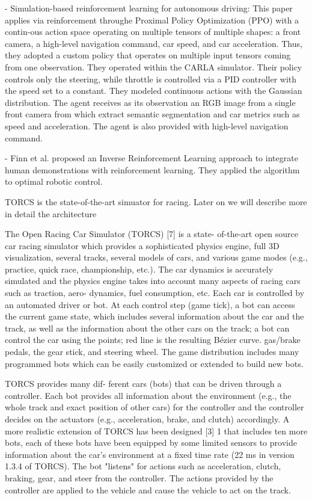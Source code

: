 - Simulation-based reinforcement learning for autonomous driving:
This paper applies via reinforcement throughe Proximal Policy Optimization (PPO) with a contin-ous action space operating on multiple tensors of multiple shapes: a front camera, a high-level navigation command, car speed, and car acceleration. Thus, they adopted a custom policy that operates on multiple input tensors coming from one observation. They operated within the CARLA simulator. Their policy controls only the steering, while throttle is controlled via a PID controller with the speed set to a constant.
They modeled continuous actions with the Gaussian distribution.
The agent receives as its observation an RGB image from a single front camera from which extract semantic segmentation and car metrics such as speed and acceleration. The agent is also provided with high-level navigation command. 



- Finn et al. proposed an Inverse Reinforcement Learning \cite{inverse} approach to integrate human demonstrations with reinforcement learning. They applied the algorithm to optimal robotic control.




TORCS is the state-of-the-art simuator for racing. Later on we will describe more in detail the architecture



The Open Racing Car Simulator (TORCS) [7] is a state-
of-the-art open source car racing simulator which provides
a sophisticated physics engine, full 3D visualization, several
tracks, several models of cars, and various game modes (e.g.,
practice, quick race, championship, etc.). The car dynamics
is accurately simulated and the physics engine takes into
account many aspects of racing cars such as traction, aero-
dynamics, fuel consumption, etc.
Each car is controlled by an automated driver or bot. At
each control step (game tick), a bot can access the current
game state, which includes several information about the
car and the track, as well as the information about the
other cars on the track; a bot can control the car using the
points; red line is the resulting Bézier curve.
gas/brake pedals, the gear stick, and steering wheel. The
game distribution includes many programmed bots which can
be easily customized or extended to build new bots.



TORCS provides many dif-
ferent cars (bots) that can be driven through a controller. Each
bot provides all information about the environment (e.g., the
whole track and exact position of other cars) for the controller
and the controller decides on the actuators (e.g., acceleration,
brake, and clutch) accordingly. A more realistic extension of
TORCS has been designed [3] 1 that includes ten more bots,
each of these bots have been equipped by some limited sensors
to provide information about the car’s environment at a fixed
time rate (22 ms in version 1.3.4 of TORCS). The bot "listens"
for actions such as acceleration, clutch, braking, gear, and steer
from the controller. The actions provided by the controller are
applied to the vehicle and cause the vehicle to act on the track.


